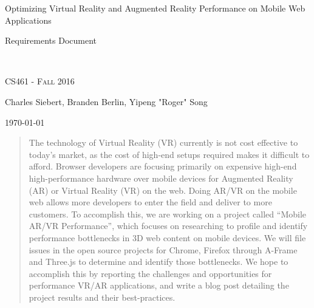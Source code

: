 \documentclass[letterpaper,10pt,titlepage,draftclsnofoot,onecolumn,compsoc,utf8,latin1]{IEEEtran}
\def\name{Charles Siebert, Branden Berlin, Yipeng "Roger" Song}
\begin{document}
\begin{titlepage}
\centering
\vspace*{6cm}
{\scshape\LARGE \begin{singlespace}Optimizing Virtual Reality and Augmented Reality Performance on Mobile Web Applications \\ \end{singlespace} Requirements Document } \\
	{\scshape\Large CS461 - Fall 2016 \par}
	\vspace{.5cm}
	\name \par
    {\large \today \par} 
	\vspace*{1cm}
	
\begin{abstract}
The technology of Virtual Reality (VR) currently is not cost effective to today's market, as the cost of high-end setups required makes it difficult to afford. Browser developers are focusing primarily on expensive high-end high-performance hardware over mobile devices for Augmented Reality (AR) or Virtual Reality (VR) on the web. Doing AR/VR on the mobile web allows more developers to enter the field and deliver to more customers. To accomplish this, we are working on a project called “Mobile AR/VR Performance”, which focuses on researching to profile and identify performance bottlenecks in 3D web content on mobile devices. We will file issues in the open source projects for Chrome, Firefox through A-Frame and Three.js to determine and identify those bottlenecks. We hope to accomplish this by reporting the challenges and opportunities for performance VR/AR applications, and write a blog post detailing the project results and their best-practices.
\end{abstract}

\end{titlepage}

\newpage

\tableofcontents

\thispagestyle{empty}

\newpage
\end{document}
